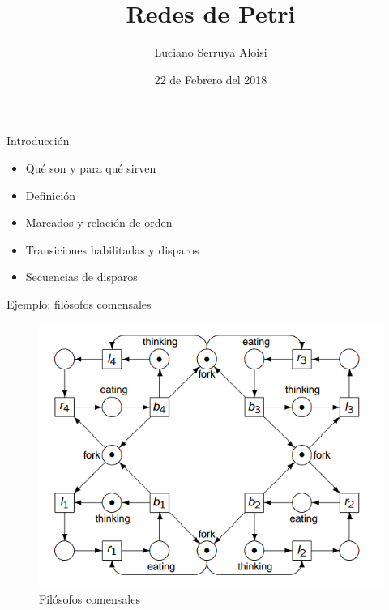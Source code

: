 \documentclass[
compress,
xcolor=table,
dvipsnames,
]{beamer}
\title[\arabic{page} ]{Redes de Petri}
\author{Luciano Serruya Aloisi}
\institute[UNPSJB]{Universidad Nacional de la Patagonia San Juan Bosco}
\date{22 de Febrero del 2018}
\begin{document}
\begin{frame}[plain]
  \titlepage
\end{frame}




\begin{frame}{Introducción}
    \begin{itemize}
        \item Qué son y para qué sirven
        \item{Definición}
        \item{Marcados y relación de orden}
        \item{Transiciones habilitadas y disparos}
        \item{Secuencias de disparos}
    \end{itemize}
\end{frame}

\begin{frame}{Ejemplo: filósofos comensales}
    \begin{figure}[h]
        \includegraphics[scale=0.45]{graphics/dining_philosophers.png}
        \caption{Filósofos comensales }
    \end{figure}
\end{frame}
\end{document}
